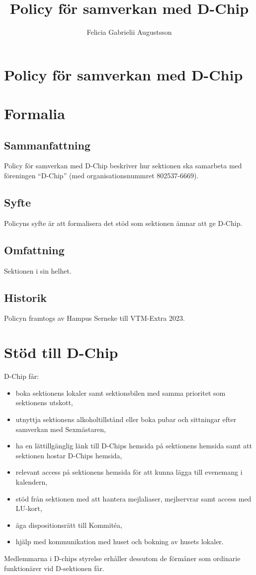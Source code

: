 \documentclass{dsekprotokoll}
\title{Policy för samverkan med D-Chip}
\author{Felicia Gabrielii Augustsson}
\begin{document}
\section*{Policy för samverkan med D-Chip}
\section{Formalia}
\subsection{Sammanfattning}
Policy för samverkan med D-Chip beskriver hur sektionen ska samarbeta med föreningen “D-Chip” (med organisationsnummret 802537-6669).
\subsection{Syfte}
Policyns syfte är att formalisera det stöd som sektionen ämnar att ge D-Chip. 
\subsection{Omfattning}
Sektionen i sin helhet.

\subsection{Historik}

Policyn framtogs av Hampus Serneke till VTM-Extra 2023.

\section{Stöd till D-Chip}

D-Chip får:

\begin{itemize}
    \item boka sektionens lokaler samt sektionsbilen med samma prioritet som sektionens utskott,
    \item utnyttja sektionens alkoholtillstånd eller boka pubar och sittningar efter samverkan med Sexmästaren,
    \item ha en lättillgänglig länk till D-Chips hemsida på sektionens hemsida samt att sektionen hostar D-Chips hemsida,
    \item relevant access på sektionens hemsida för att kunna lägga till evenemang i kalendern,
    \item stöd från sektionen med att hantera mejlaliaser, mejlservrar samt access med LU-kort,
    \item äga dispositionsrätt till Kommitéa,
    \item hjälp med kommunikation med huset och bokning av husets lokaler.
\end{itemize}

Medlemmarna i D-chips styrelse erhåller dessutom de förmåner som ordinarie funktionärer vid D-sektionen får.
\end{document}
